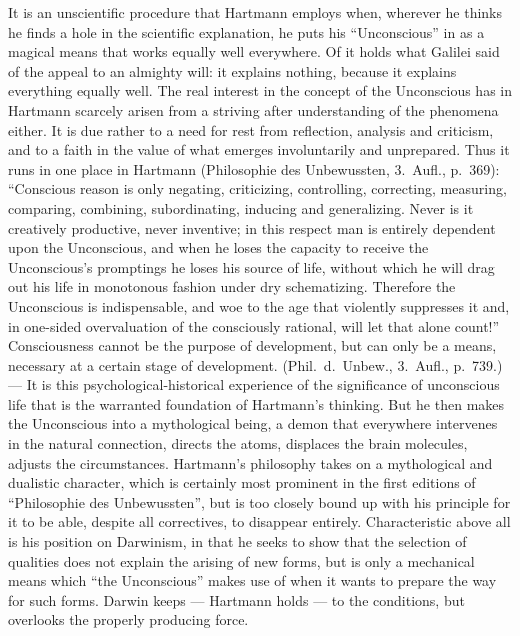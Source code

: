 \documentclass[12pt,a4paper]{book}
\newcommand{\opage}[1]{\marginnote{\footnotesize\textit{[#1]}}}
\begin{document}
It is an unscientific procedure that Hartmann employs when, wherever he thinks he
finds a hole in the scientific explanation, he puts his ``Unconscious'' in as a
magical means that works equally well everywhere. Of it holds what Galilei said
of the appeal to an almighty will: it explains nothing, because it explains
everything equally well. The real interest in the concept of the Unconscious has
in Hartmann scarcely arisen from a striving after understanding of the phenomena
either. It is due rather to a need for rest from reflection, analysis and
criticism, and to a faith in the value of what emerges involuntarily and
unprepared. Thus it runs in one place in Hartmann (Philosophie des Unbewussten,
3.~Aufl., p.~369): ``Conscious reason is only negating, criticizing, controlling,
correcting, measuring, comparing, combining, subordinating, inducing and
generalizing. Never is it creatively productive, never inventive; in this respect
man is entirely dependent upon the Unconscious, and when he loses the capacity to
receive the Unconscious's promptings he loses his source of life, without which
he will drag out his life in monotonous \opage{539}fashion under dry schematizing. Therefore
the Unconscious is indispensable, and woe to the age that violently suppresses it
and, in one-sided overvaluation of the consciously rational, will let that alone
count!'' Consciousness cannot be the purpose of development, but can only be a
means, necessary at a certain stage of development. (Phil.\ d.\ Unbew.,
3.~Aufl., p.~739.) --- It is this psychological-historical experience of the
significance of unconscious life that is the warranted foundation of Hartmann's
thinking. But he then makes the Unconscious into a mythological being, a demon
that everywhere intervenes in the natural connection, directs the atoms,
displaces the brain molecules, adjusts the circumstances. Hartmann's philosophy
takes on a mythological and dualistic character, which is certainly most
prominent in the first editions of ``Philosophie des Unbewussten'', but is too
closely bound up with his principle for it to be able, despite all correctives,
to disappear entirely. Characteristic above all is his position on Darwinism, in
that he seeks to show that the selection of qualities does not explain the
arising of new forms, but is only a mechanical means which ``the Unconscious''
makes use of when it wants to prepare the way for such forms. Darwin keeps ---
Hartmann holds --- to the conditions, but overlooks the properly producing force.
\end{document}
